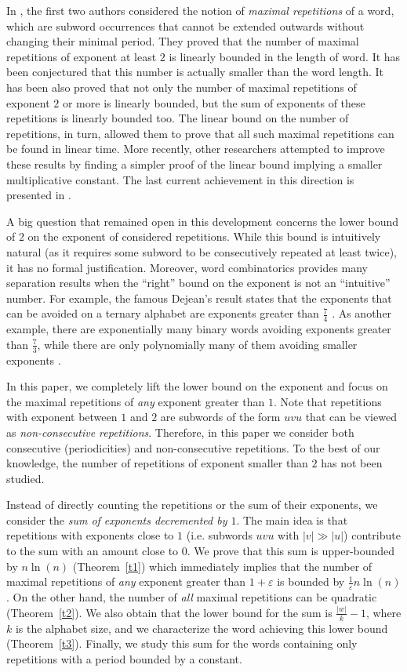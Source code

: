 \documentclass[11pt]{article}
\begin{document}
In \cite{KolpakovKucherovFCT99,KolpakovKucherovJDA00}, the first two
authors considered the notion of {\em maximal repetitions} of a word,
which are subword occurrences that cannot be extended outwards without
changing their minimal period. They proved that the number of maximal
repetitions of exponent at least $2$ is linearly bounded in the length
of word. It has been conjectured that this number is actually smaller
than the word length. It has been also proved that not only the number
of maximal repetitions of exponent $2$ or more is linearly bounded,
but the sum of exponents of these repetitions is linearly bounded
too. 
The linear bound on the number of repetitions, in turn, allowed them to prove that all such
maximal repetitions can be found in linear time. More recently, other
researchers attempted to improve these results by finding a simpler
proof of the linear bound implying a smaller multiplicative
constant. The last current achievement in this direction is presented
in \cite{CrochemoreIlieTintaCPM08}. 

A big question that remained open in this development concerns the
lower bound of $2$ on the exponent of considered repetitions. While
this bound is intuitively natural (as it requires some subword to be
consecutively repeated at least twice), it has no formal
justification. Moreover, word combinatorics provides many separation
results when the ``right'' bound on the exponent is not an
``intuitive'' number. For example, the famous Dejean's result states
that the exponents that can be avoided on a ternary alphabet are
exponents greater than $\frac{7}{4}$ \cite{Dejean72}. As another example, there are
exponentially many binary words avoiding exponents greater than
$\frac{7}{3}$, while there are only polynomially many of them avoiding
smaller exponents \cite{KarSha04}. 

In this paper, we completely lift the lower bound on the exponent and focus on the
maximal repetitions of {\em any} exponent greater than $1$. Note that
repetitions with exponent between $1$ and $2$ are subwords of the form
$uvu$ that can be viewed as {\em non-consecutive
  repetitions}. Therefore, in this paper we consider both consecutive
(periodicities) and non-consecutive repetitions. To the best of our
knowledge, the number of repetitions of exponent smaller than $2$ has
not been studied. 

Instead of directly counting the repetitions or the sum of their
exponents, we consider the {\em sum of exponents decremented by
  $1$}. The main idea is that repetitions with exponents close to $1$
(i.e. subwords $uvu$ with $|v|\gg |u|$) contribute to the sum with an
amount close to $0$. We prove that this sum is upper-bounded by
$n\ln(n)$ (Theorem~\ref{t1}) which immediately implies that the number
of maximal repetitions of {\em any} exponent greater than
$1+\varepsilon$ is bounded by $\frac{1}{\varepsilon}n\ln(n)$. On the
other hand, the number of {\em all} maximal repetitions can be
quadratic (Theorem~\ref{t2}). We also obtain that the lower bound for
the sum is $\frac{|w|}{k}-1$, where $k$ is the alphabet size, and we
characterize the word achieving this lower bound
(Theorem~\ref{t3}). Finally, we study this sum for the words
containing only repetitions with a period bounded by a constant. 
\end{document}
